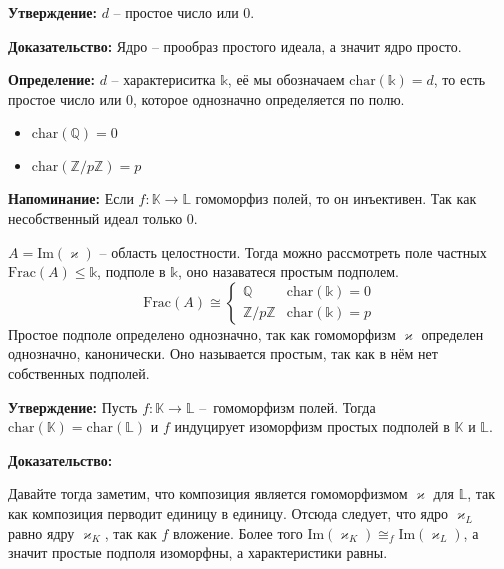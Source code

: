 \documentclass[a4paper, 12pt]{book}
\begin{document}
 \textbf{Утверждение:} $d$ – простое число или 0.

 \textbf{Доказательство:} Ядро – прообраз простого идеала, а значит ядро просто.

 \textbf{Определение:} $d$ – характериситка $\mathbb{k}$, её мы обозначаем
 $\text{char}(\mathbb{k})=d$, то есть простое число или 0, которое однозначно
 определяется по полю.

 \begin{itemize}
     \item $\text{char}(\mathbb{Q})=0$
     \item $\text{char}(\mathbb{Z}/p\mathbb{Z})=p$
 \end{itemize}

 \textbf{Напоминание:} Если $f:\mathbb{K}\rightarrow\mathbb{L}$ гомоморфиз
 полей, то он инъективен. Так как несобственный идеал только 0.

 $A=\text{Im}(\varkappa)$ – область целостности. Тогда можно рассмотреть поле
 частных $\text{Frac}(A)\leq\mathbb{k}$, подполе в $\mathbb{k}$, оно назаватеся
 простым подполем.
 \[\text{Frac}(A)\cong \left\{\begin{array}{rcl}\mathbb{Q} & \text{char}(\mathbb{k})=0\\
                                                \mathbb{Z}/p\mathbb{Z} &\text{char}(\mathbb{k})=p
                              \end{array}\right.\]
Простое подполе определено однозначно, так как гомоморфизм $\varkappa$ определен
однозначно, канонически. Оно называется простым, так как в нём нет собственных
подполей.

\textbf{Утверждение:} Пусть $f:\mathbb{K}\rightarrow\mathbb{L}$ – гомоморфизм
полей. Тогда $\text{char}(\mathbb{K})=\text{char}(\mathbb{L})$ и $f$ индуцирует
изоморфизм простых подполей в $\mathbb{K}$ и $\mathbb{L}$.

\textbf{Доказательство:}
\begin{center}
\end{center}
Давайте тогда заметим, что композиция является гомоморфизмом $\varkappa$ для
$\mathbb{L}$, так как композиция перводит единицу в единицу. Отсюда следует,
что ядро $\varkappa_L$ равно ядру $\varkappa_K$, так как $f$ вложение. Более
того $\text{Im}(\varkappa_K)\cong_f\text{Im}(\varkappa_L)$, а значит простые
подполя изоморфны, а характеристики равны.
\end{document}
